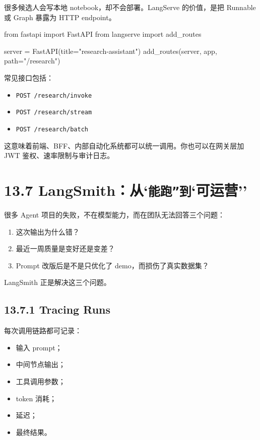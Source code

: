 很多候选人会写本地 notebook，却不会部署。LangServe 的价值，是把 Runnable 或 Graph 暴露为 HTTP endpoint。


\begin{codeblock}
from fastapi import FastAPI
from langserve import add_routes

server = FastAPI(title="research-assistant")
add_routes(server, app, path="/research")
\end{codeblock}

常见接口包括：


\begin{itemize}[leftmargin=2em]
\item \texttt{POST /research/invoke}
\item \texttt{POST /research/stream}
\item \texttt{POST /research/batch}
\end{itemize}

这意味着前端、BFF、内部自动化系统都可以统一调用。你也可以在网关层加 JWT 鉴权、速率限制与审计日志。


\section{13.7 LangSmith：从`\texttt{能跑''到}`可运营''}

很多 Agent 项目的失败，不在模型能力，而在团队无法回答三个问题：


\begin{enumerate}[leftmargin=2em]
\item 这次输出为什么错？
\item 最近一周质量是变好还是变差？
\item Prompt 改版后是不是只优化了 demo，而损伤了真实数据集？
\end{enumerate}

LangSmith 正是解决这三个问题。


\subsection{13.7.1 Tracing Runs}

每次调用链路都可记录：


\begin{itemize}[leftmargin=2em]
\item 输入 prompt；
\item 中间节点输出；
\item 工具调用参数；
\item token 消耗；
\item 延迟；
\item 最终结果。
\end{itemize}

